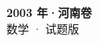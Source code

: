 \documentclass[zihao=-4, a4paper]{ctexart}
\begin{document}
\begin{center}
  {\Large\bfseries 2003 年·河南卷}\\[4pt]
  {\large 数学 · 试题版}
\end{center}
\medskip
{}

\end{document}

